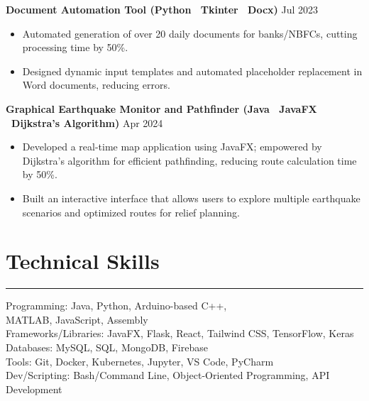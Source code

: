 \documentclass[a4paper]{article}
\newcommand{\sectionline}{%
  \par\vspace{0.2ex}%
  \noindent\rule{\linewidth}{0.25pt}%
  \par\vspace{0.2ex}%
}
\newcommand{\entryspace}{\vspace{0.35em}}
\begin{document}
\textbf{Document Automation Tool (Python \textbar\ Tkinter \textbar\ Docx)} \hfill Jul 2023
\begin{itemize}
    \item Automated generation of over 20 daily documents for banks/NBFCs, cutting processing time by 50\%.
    \item Designed dynamic input templates and automated placeholder replacement in Word documents, reducing errors.
\end{itemize}
\entryspace

\textbf{Graphical Earthquake Monitor and Pathfinder (Java \textbar\ JavaFX \textbar\ Dijkstra’s Algorithm)} \hfill Apr 2024
\begin{itemize}
    \item Developed a real-time map application using JavaFX; empowered by Dijkstra's algorithm for efficient pathfinding, reducing route calculation time by 50\%.
    \item Built an interactive interface that allows users to explore multiple earthquake scenarios and optimized routes for relief planning.
\end{itemize}

\section*{Technical Skills}
\sectionline
Programming: Java, Python, Arduino-based C++,\\
MATLAB, JavaScript, Assembly\\
Frameworks/Libraries: JavaFX, Flask, React, Tailwind CSS, TensorFlow, Keras\\
Databases: MySQL, SQL, MongoDB, Firebase\\
Tools: Git, Docker, Kubernetes, Jupyter, VS Code, PyCharm\\
Dev/Scripting: Bash/Command Line, Object-Oriented Programming, API Development
\end{document}
